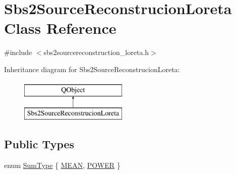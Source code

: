 \hypertarget{classSbs2SourceReconstrucionLoreta}{\section{Sbs2\-Source\-Reconstrucion\-Loreta Class Reference}
\label{classSbs2SourceReconstrucionLoreta}
}


{\ttfamily \#include $<$sbs2sourcereconstruction\-\_\-loreta.\-h$>$}

Inheritance diagram for Sbs2\-Source\-Reconstrucion\-Loreta\-:\begin{figure}[H]
\begin{center}
\leavevmode
\includegraphics[height=2.000000cm]{classSbs2SourceReconstrucionLoreta}
\end{center}
\end{figure}
\subsection*{Public Types}
\begin{DoxyCompactItemize}
\item 
enum \hyperlink{classSbs2SourceReconstrucionLoreta_aebf0de7b32b377d64f23f1bf71c119f7}{Sum\-Type} \{ \hyperlink{classSbs2SourceReconstrucionLoreta_aebf0de7b32b377d64f23f1bf71c119f7afc730e604c373aa6245980e92fcc14af}{M\-E\-A\-N}, 
\hyperlink{classSbs2SourceReconstrucionLoreta_aebf0de7b32b377d64f23f1bf71c119f7ad1e58d65e4f8e7977e07100eeeb056c7}{P\-O\-W\-E\-R}
 \}
\end{DoxyCompactItemize}

